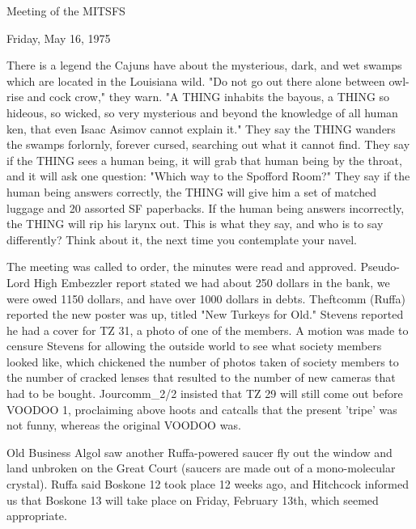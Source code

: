 \documentclass[12pt]{article}
\begin{document}
\begin{center}

Meeting of the MITSFS

Friday, May 16, 1975

\end{center}
 
\vspace{12pt}

\setlength{\parskip}{6pt}

\noindent
There is a legend the Cajuns have about the mysterious, dark, and wet swamps which are located in the Louisiana wild. "Do not go out there alone between owl-rise and cock crow," they warn. "A THING inhabits the bayous, a THING so hideous, so wicked, so very mysterious and beyond the knowledge of all human ken, that even Isaac Asimov cannot explain it." They say the THING wanders the swamps forlornly, forever cursed, searching out what it cannot find. They say if the THING sees a human being, it will grab that human being by the throat, and it will ask one question: "Which way to the Spofford Room?" They say if the human being answers correctly, the THING will give him a set of matched luggage and 20 assorted SF paperbacks. If the human being answers incorrectly, the THING will rip his larynx out. This is what they say, and who is to say differently? Think about it, the next time you contemplate your navel.

The meeting was called to order, the minutes were read and approved. Pseudo-Lord High Embezzler report stated we had about 250 dollars in the bank, we were owed 1150 dollars, and have over 1000 dollars in debts. Theftcomm (Ruffa) reported the new poster was up, titled "New Turkeys for Old." Stevens reported he had a cover for TZ 31, a photo of one of the members. A motion was made to censure Stevens for allowing the outside world to see what society members looked like, which chickened the number of photos taken of society members to the number of cracked lenses that resulted to the number of new cameras that had to be bought. Jourcomm_2/2 insisted that TZ 29 will still come out before VOODOO 1, proclaiming above hoots and catcalls that the present 'tripe' was not funny, whereas the original VOODOO was.

Old Business Algol saw another Ruffa-powered saucer fly out the window and land unbroken on the Great Court (saucers are made out of a mono-molecular crystal). Ruffa said Boskone 12 took place 12 weeks ago, and Hitchcock informed us that Boskone 13 will take place on Friday, February 13th, which seemed appropriate.
\end{document}
